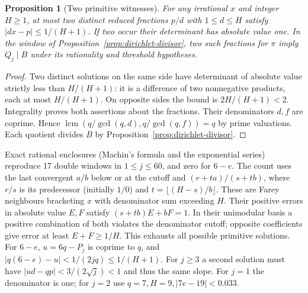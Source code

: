 \documentclass[11pt]{amsart}
\newtheorem{proposition}[theorem]{Proposition}
\theoremstyle{definition}
\theoremstyle{remark}
\numberwithin{equation}{section}
\begin{document}
\begin{proposition}[Two primitive witnesses]\label{prop:two-window}
For any irrational $x$ and integer $H\ge1$, at most two distinct reduced
fractions $p/d$ with $1\le d\le H$ satisfy $|dx-p|\le1/(H+1)$.
If two occur their determinant has absolute value one. In the window of
Proposition~\ref{prop:dirichlet-divisor}, two such fractions for $\pi$
imply $Q_j\mid B$ under its rationality and threshold hypotheses.
\end{proposition}
\begin{proof}
Two distinct solutions on the same side have determinant of absolute
value strictly less than $H/(H+1)$: it is a difference of two
nonnegative products, each at most $H/(H+1)$. On opposite sides the
bound is $2H/(H+1)<2$. Integrality proves both assertions about the
fractions. Their denominators $d,f$ are coprime. Hence
$\operatorname{lcm}(q/\gcd(q,d),q/\gcd(q,f))=q$ by prime valuations.
Each quotient divides $B$ by Proposition~\ref{prop:dirichlet-divisor}.
\end{proof}
Exact rational enclosures (Machin's formula and the exponential series)
reproduce 17 double windows in $1\le j\le60$, and zero for $6-e$.
The count uses the last convergent $a/b$ below or at the cutoff and
$(r+ta)/(s+tb)$, where $r/s$ is its predecessor (initially $1/0$)
and $t=\lfloor(H-s)/b\rfloor$. These are Farey neighbours bracketing
$x$ with denominator sum exceeding $H$. Their positive errors in
absolute value $E,F$ satisfy $(s+tb)E+bF=1$. In their unimodular
basis a positive combination of both violates the denominator cutoff;
opposite coefficients give error at least $E+F\ge1/H$. This exhausts
all possible primitive solutions. For $6-e$, $u=6q-P_j$ is coprime to
$q$, and $|q(6-e)-u|<1/(2jq)\le1/(H+1)$.
For $j\ge3$ a second solution must have
$|ud-qp|<3/(2\sqrt j)<1$ and thus the same slope. For $j=1$ the
denominator is one; for $j=2$ use $q=7,H=9, |7e-19|<0.033$.
\end{document}

